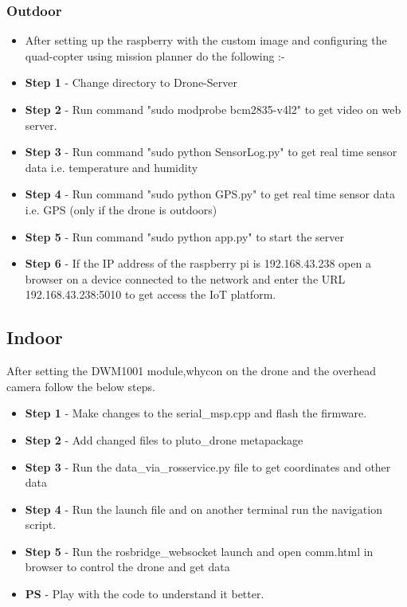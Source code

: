 \documentclass[a4paper,12pt,oneside]{book}
\begin{document}
\subsubsection*{Outdoor}
\begin{itemize}
\item After setting up the raspberry with the custom image and configuring the quad-copter using mission planner do the following :-
\item \textbf{Step 1} - Change directory to Drone-Server
\item \textbf{Step 2} - Run command "sudo modprobe bcm2835-v4l2" to get video on web server.
\item \textbf{Step 3} - Run command "sudo python SensorLog.py" to get real time sensor data i.e. temperature and humidity
\item \textbf{Step 4} - Run command "sudo python GPS.py" to get real time sensor data i.e. GPS (only if the drone is outdoors)
\item \textbf{Step 5} - Run command "sudo python app.py" to start the server
\item \textbf{Step 6} - If the IP address of the raspberry pi is 192.168.43.238 open a browser on a device connected to the network and enter the URL 192.168.43.238:5010 to get access the IoT platform.

\end{itemize}

\subsection*{Indoor}
After setting the DWM1001 module,whycon on the drone and the overhead camera follow the below steps.
\begin{itemize}
\item \textbf{Step 1} - Make changes to the serial\_msp.cpp and flash the firmware.
\item \textbf{Step 2} - Add changed files to pluto\_drone metapackage
\item \textbf{Step 3} - Run the data\_via\_rosservice.py file to get coordinates and other data
\item \textbf{Step 4} - Run the launch file and on another terminal run the navigation script.
\item \textbf{Step 5} - Run the rosbridge\_websocket launch and open comm.html in browser to control the drone and get data
\item \textbf{PS} - Play with the code to understand it better.
\end{itemize}
\end{document}
